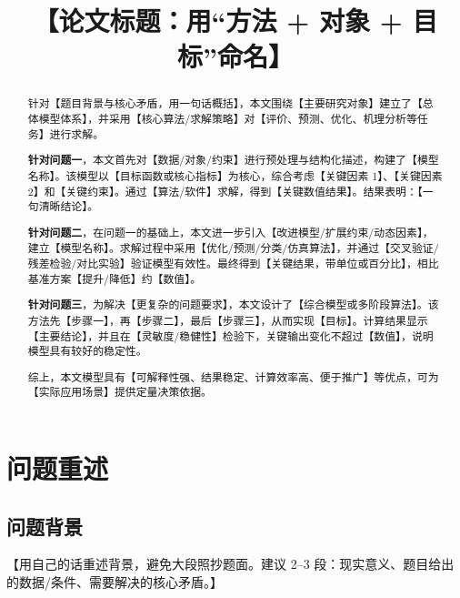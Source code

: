 \documentclass{cumcmthesis}
\title{【论文标题：用“方法 + 对象 + 目标”命名】}
\begin{document}
\maketitle

\begin{abstract}
针对【题目背景与核心矛盾，用一句话概括】，本文围绕【主要研究对象】建立了【总体模型体系】，并采用【核心算法/求解策略】对【评价、预测、优化、机理分析等任务】进行求解。

\textbf{针对问题一}，本文首先对【数据/对象/约束】进行预处理与结构化描述，构建了【模型名称】。该模型以【目标函数或核心指标】为核心，综合考虑【关键因素 1】、【关键因素 2】和【关键约束】。通过【算法/软件】求解，得到【关键数值结果】。结果表明：【一句清晰结论】。

\textbf{针对问题二}，在问题一的基础上，本文进一步引入【改进模型/扩展约束/动态因素】，建立【模型名称】。求解过程中采用【优化/预测/分类/仿真算法】，并通过【交叉验证/残差检验/对比实验】验证模型有效性。最终得到【关键结果，带单位或百分比】，相比基准方案【提升/降低】约【数值】。

\textbf{针对问题三}，为解决【更复杂的问题要求】，本文设计了【综合模型或多阶段算法】。该方法先【步骤一】，再【步骤二】，最后【步骤三】，从而实现【目标】。计算结果显示【主要结论】，并且在【灵敏度/稳健性】检验下，关键输出变化不超过【数值】，说明模型具有较好的稳定性。

综上，本文模型具有【可解释性强、结果稳定、计算效率高、便于推广】等优点，可为【实际应用场景】提供定量决策依据。

\end{abstract}


\section{问题重述}

\subsection{问题背景}
【用自己的话重述背景，避免大段照抄题面。建议 2--3 段：现实意义、题目给出的数据/条件、需要解决的核心矛盾。】
\end{document}
